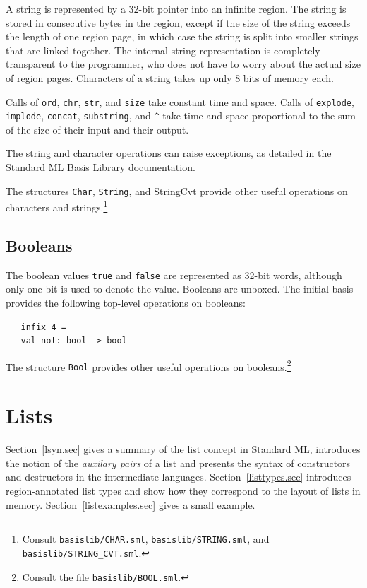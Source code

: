 \documentclass[12pt]{book}
\begin{document}
A string is represented by a 32-bit pointer into an infinite region.
The string is stored in consecutive bytes in the region, except if the
size of the string exceeds the length of one region page, in which
case the string is split into smaller strings that are linked
together. The internal string representation is completely transparent
to the programmer, who does not have to worry about the actual size of
region pages. Characters of a string takes up only 8 bits of
memory each.

Calls of {\tt ord}, {\tt chr}, {\tt str}, and {\tt size} take constant
time and space.  Calls of {\tt explode}, {\tt implode}, {\tt concat},
{\tt substring}, and \verb+^+ take time and space proportional to the
sum of the size of their input and their output.

The string and character operations can raise exceptions, as detailed in the
Standard ML Basis Library documentation.

The structures {\tt Char}, {\tt String}, and {StringCvt} provide other
useful operations on characters and strings.\footnote{Consult {\tt basislib/CHAR.sml}, {\tt basislib/STRING.sml},
  and {\tt basislib/STRING\_CVT.sml}.}

\section{Booleans}
The boolean values {\tt true} and {\tt false} are represented as
32-bit words, although only one bit is used to denote the value.
Booleans are unboxed. The 
%
initial basis provides the following top-level operations on
booleans:
%
%
\begin{verbatim}
   infix 4 =
   val not: bool -> bool
\end{verbatim}
The structure {\tt Bool} provides other useful operations on
booleans.\footnote{Consult the file {\tt basislib/BOOL.sml}.}

\chapter{Lists}
\label{lists.sec}
Section~\ref{lsyn.sec} gives a summary of the list concept in Standard
ML, introduces the notion of the {\em auxilary pairs} of a list and
presents the syntax of constructors and destructors in the
intermediate languages.  Section~\ref{listtypes.sec} introduces
region-annotated list types and show how they correspond to the layout
of lists in memory.  Section~\ref{listexamples.sec} gives a small
example.
\end{document}
